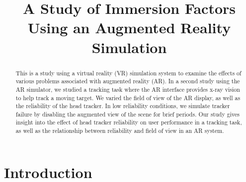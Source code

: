 \documentclass{acmsiggraph}                     %
\title{A Study of Immersion Factors Using an Augmented Reality Simulation}
\author{
}
\begin{document}


\maketitle


\begin{abstract}
This is a study using a virtual reality (VR) simulation system to examine the effects of various problems associated with augmented reality (AR). In a second study using the AR simulator, we studied a tracking task where the AR interface provides x-ray vision to help track a moving target.  We varied the field of view of the AR display, as well as the reliability of the head tracker.  In low reliability conditions, we simulate tracker failure by disabling the augmented view of the scene for brief periods.  Our study gives insight into the effect of head tracker reliability on user performance in a tracking task, as well as the relationship between reliability and field of view in an AR system.

\end{abstract}


\begin{CRcatlist}
\end{CRcatlist}

\keywordlist

\section{Introduction}

\end{document}
